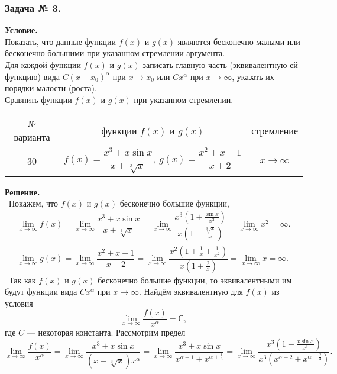 \subsubsection*{\center Задача № 3.}
{\bf Условие.~}\\
 Показать, что данные функции
$f(x)$ и $g(x)$ являются бесконечно малыми или бесконечно большими
при указанном стремлении аргумента. \\
 Для каждой функции $f(x)$ и $g(x)$ записать главную часть
(эквивалентную ей функцию)  вида $C(x-x_0)^{\alpha}$ при $x\rightarrow x_0$ или $Cx^{\alpha}$
при $x\rightarrow\infty$, указать их порядки малости (роста). \\
 Сравнить функции $f(x)$ и $g(x)$ при указанном стремлении.
\begin{center}
	\begin{tabular}{|c|c|c|}
		\hline
		№ варианта & функции $f(x)$ и $g(x)$ & стремление \\[6pt]
		30 & $f(x) = \dfrac{x^3+x\sin{x}}{x+\sqrt[3]{x}},~g(x)=\dfrac{x^2+x+1}{x+2}$ & $x\rightarrow\infty$ \\
		\hline
	\end{tabular}
\end{center}
{\bf Решение.~}\\
~Покажем, что $f(x)$ и $g(x)$ бесконечно большие функции,
$$
\begin{array}{cc}
\lim\limits_{x\rightarrow\infty}f(x) = \lim\limits_{x\rightarrow\infty}\dfrac{x^3+x\sin{x}}{x+\sqrt[3]{x}} =
\lim\limits_{x\rightarrow\infty}\dfrac{x^3(1+\frac{\sin{x}}{x^2})}{x(1+\frac{\sqrt[3]{x}}{x})} = 
\lim\limits_{x\rightarrow\infty}x^2 = \infty. \\
\lim\limits_{x\rightarrow\infty}g(x) = \lim\limits_{x\rightarrow\infty}\dfrac{x^2+x+1}{x+2} = 
\lim\limits_{x\rightarrow\infty}\dfrac{x^2(1+\frac1x+\frac{1}{x^2})}{x(1+\frac2x)} = 
\lim\limits_{x\rightarrow\infty}x = \infty.
\end{array}
$$	
~Так как $f(x)$ и $g(x)$ бесконечно большие функции, то эквивалентными им будут функции вида 
$Cx^{\alpha}$ при $x\rightarrow\infty$. Найдём эквивалентную для $f(x)$ из условия
$$
\lim\limits_{x\rightarrow\infty}\dfrac{f(x)}{x^{\alpha}} = С,
$$
где $C$ --- некоторая константа. Рассмотрим предел
$$
\lim\limits_{x\rightarrow\infty}\dfrac{f(x)}{x^{\alpha}} = 
\lim\limits_{x\rightarrow\infty}\dfrac{x^3+x\sin{x}}{(x+\sqrt[3]{x})x^{\alpha}} =
\lim\limits_{x\rightarrow\infty}\dfrac{x^3+x\sin{x}}{x^{\alpha+1}+x^{\alpha+\frac13}} =
\lim\limits_{x\rightarrow\infty}\dfrac{x^3(1+\frac{x\sin{x}}{x^3})}{x^3(x^{\alpha-2}+x^{\alpha-\frac23})}.
$$
